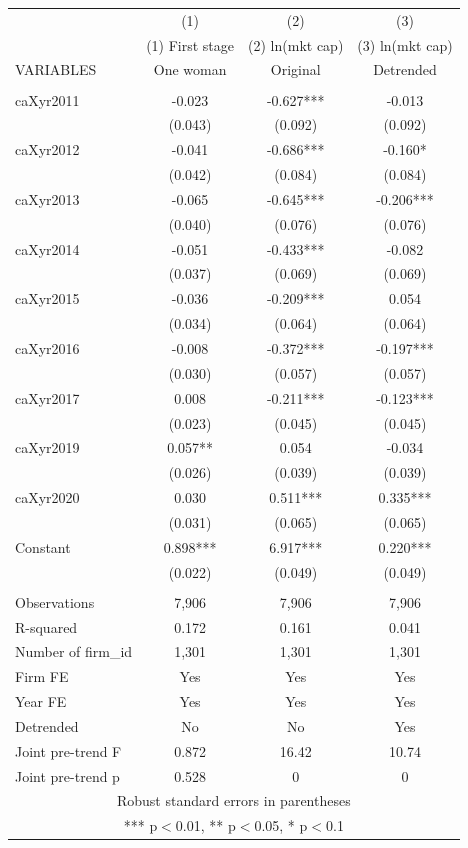 \begin{tabular}{lccc} \hline
 & (1) & (2) & (3) \\
 & (1) First stage & (2) ln(mkt cap) & (3) ln(mkt cap) \\
VARIABLES & One woman & Original & Detrended \\ \hline
 &  &  &  \\
caXyr2011 & -0.023 & -0.627*** & -0.013 \\
 & (0.043) & (0.092) & (0.092) \\
caXyr2012 & -0.041 & -0.686*** & -0.160* \\
 & (0.042) & (0.084) & (0.084) \\
caXyr2013 & -0.065 & -0.645*** & -0.206*** \\
 & (0.040) & (0.076) & (0.076) \\
caXyr2014 & -0.051 & -0.433*** & -0.082 \\
 & (0.037) & (0.069) & (0.069) \\
caXyr2015 & -0.036 & -0.209*** & 0.054 \\
 & (0.034) & (0.064) & (0.064) \\
caXyr2016 & -0.008 & -0.372*** & -0.197*** \\
 & (0.030) & (0.057) & (0.057) \\
caXyr2017 & 0.008 & -0.211*** & -0.123*** \\
 & (0.023) & (0.045) & (0.045) \\
caXyr2019 & 0.057** & 0.054 & -0.034 \\
 & (0.026) & (0.039) & (0.039) \\
caXyr2020 & 0.030 & 0.511*** & 0.335*** \\
 & (0.031) & (0.065) & (0.065) \\
Constant & 0.898*** & 6.917*** & 0.220*** \\
 & (0.022) & (0.049) & (0.049) \\
 &  &  &  \\
Observations & 7,906 & 7,906 & 7,906 \\
R-squared & 0.172 & 0.161 & 0.041 \\
Number of firm\_id & 1,301 & 1,301 & 1,301 \\
Firm FE & Yes & Yes & Yes \\
Year FE & Yes & Yes & Yes \\
Detrended & No & No & Yes \\
Joint pre-trend F & 0.872 & 16.42 & 10.74 \\
 Joint pre-trend p & 0.528 & 0 & 0 \\ \hline
\multicolumn{4}{c}{ Robust standard errors in parentheses} \\
\multicolumn{4}{c}{ *** p$<$0.01, ** p$<$0.05, * p$<$0.1} \\
\end{tabular}
